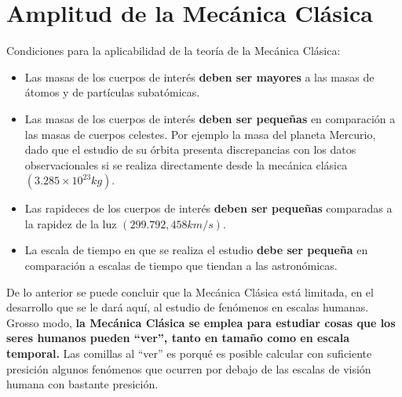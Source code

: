 \documentclass[/home/hernan/Documentos/Apuntes_mecanica_teorica/main.tex]{subfiles}
\begin{document}
    \section{Amplitud de la Mecánica Clásica}


    Condiciones para la aplicabilidad de la teoría de la Mecánica Clásica:

    \begin{itemize}
        \item Las masas de los cuerpos de interés \textbf{deben ser mayores} a las masas de átomos y de partículas subatómicas.
        \item Las masas de los cuerpos de interés \textbf{deben ser pequeñas} en comparación a las masas de cuerpos celestes. Por ejemplo la masa del planeta Mercurio, dado que el estudio de su órbita presenta discrepancias con los datos observacionales si se realiza directamente desde la mecánica clásica $\left(3.285 \times 10^{23} kg\right)$.
        \item Las rapideces de los cuerpos de interés  \textbf{deben ser pequeñas} comparadas a la rapidez de la luz $\left(299.792,458 km/s\right)$.
        \item  La escala de tiempo en que se realiza el estudio \textbf{debe ser pequeña} en comparación a escalas de tiempo que tiendan a las astronómicas.
    \end{itemize}

    De lo anterior se puede concluir que la Mecánica Clásica está limitada, en el desarrollo que se le dará aquí, al estudio de fenómenos en escalas humanas. Grosso modo, \textbf{la Mecánica Clásica se emplea para estudiar cosas que los seres humanos pueden ``ver'', tanto en tamaño como en escala temporal.} Las comillas al ``ver'' es porqué es posible calcular con suficiente presición algunos fenómenos que ocurren por debajo de las escalas de visión humana con bastante presición.
\end{document}
